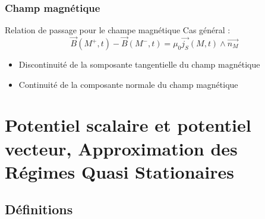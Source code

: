 \subsubsection{Champ magnétique} %
\label{sec:Champ magnétique}

\begin{Prop}{Relation de passage pour le champe magnétique}{}
Cas général :
\begin{equation}
  \overrightarrow{B} (M ^{+}, t) - \overrightarrow{B}( M ^{-}, t) = \mu_0 \overrightarrow{j_S}(M,t) \wedge \overrightarrow{n_M}
\end{equation}

\end{Prop}
\begin{itemize}




    \item Discontinuité de la somposante tangentielle du champ magnétique 

    \item Continuité de la composante normale du champ magnétique

\end{itemize}


\newpage
\section{Potentiel scalaire et potentiel vecteur, Approximation des Régimes Quasi Stationaires}
\subsection{Définitions} %
\label{sub:Définitions}


